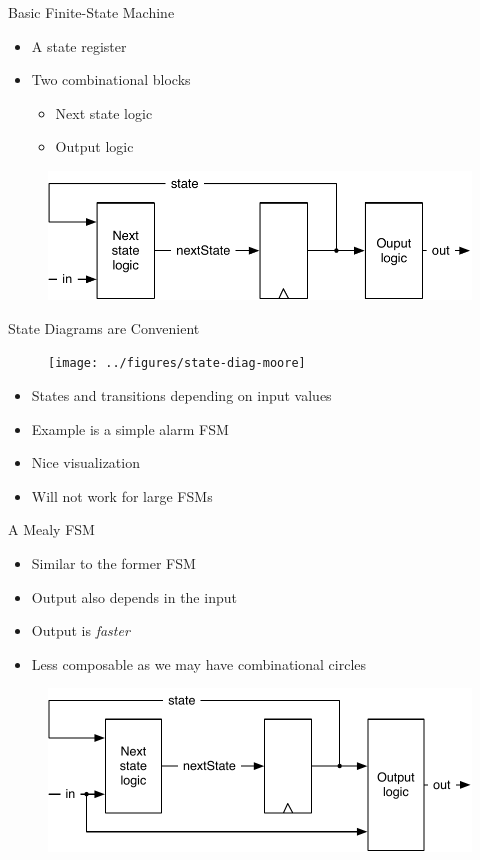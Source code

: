\begin{frame}[fragile]{Basic Finite-State Machine}
\begin{itemize}
\item A state register
\item Two combinational blocks
\begin{itemize}
\item Next state logic
\item Output logic
\end{itemize}
\end{itemize}
\begin{figure}
  \includegraphics[scale=\scale]{../figures/fsm}
\end{figure}
\end{frame}

\begin{frame}[fragile]{State Diagrams are Convenient}
\begin{figure}
  \texttt{[image: ../figures/state-diag-moore]}
\end{figure}
\begin{itemize}
\item States and transitions depending on input values
\item Example is a simple alarm FSM
\item Nice visualization
\item Will not work for large FSMs
\end{itemize}
\end{frame}


\begin{frame}[fragile]{A Mealy FSM}
\begin{itemize}
\item Similar to the former FSM
\item Output also depends in the input
\item Output is \emph{faster}
\item Less composable as we may have combinational circles
\end{itemize}
\begin{figure}
  \includegraphics[scale=\scale]{../figures/mealy}
\end{figure}
\end{frame}

